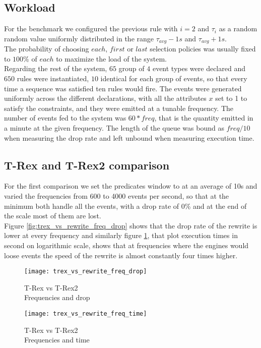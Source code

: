 \subsection{Workload}
\label{subsec:first-workload}
For the benchmark we configured the previous rule with $i=2$ and $\tau_i$ as a random random value uniformly distributed in the range $\tau_{avg} - 1s$ and $\tau_{avg} + 1s$.\\
The probability of choosing $each$, $first$ or $last$ selection policies was usually fixed to $100\%$ of $each$ to maximize the load of the system.\\
Regarding the rest of the system, $65$ group of $4$ event types were declared and $650$ rules were instantiated, $10$ identical for each group of events, so that every time a sequence was satisfied ten rules would fire. The events were generated uniformly across the different declarations, with all the attributes $x$ set to 1 to satisfy the constraints, and they were emitted at a tunable frequency. The number of events fed to the system was $60 * freq$, that is the quantity emitted in a minute at the given frequency. The length of the queue was bound as $freq / 10$ when measuring the drop rate and left unbound when measuring execution time.

\subsection{T-Rex and T-Rex2 comparison}
For the first comparison we set the predicates window to at an average of 10s and varied the frequencies from 600 to 4000 events per second, so that at the minimum both handle all the events, with a drop rate of 0\% and at the end of the scale most of them are lost.\\
Figure \ref{fig:trex_vs_rewrite_freq_drop} shows that the drop rate of the rewrite is lower at every frequency and similarly figure \ref{fig:trex_vs_rewrite_freq_time}, that plot execution times in second on logarithmic scale, shows that at frequencies where the engines would loose events the speed of the rewrite is almost constantly four times higher.
\begin{figure}[h]
\captionsetup{justification=centering}
\begin{minipage}{.5\textwidth}
  \centering
  \texttt{[image: trex\_vs\_rewrite\_freq\_drop]}
  \caption{T-Rex vs T-Rex2\\
  	Frequencies and drop}
  \label{fig:trex_vs_rewrite_freq_drop}
\end{minipage}%
\begin{minipage}{.5\textwidth}
  \centering
  \texttt{[image: trex\_vs\_rewrite\_freq\_time]}
  \caption{T-Rex vs T-Rex2\\
  	Frequencies and time}
  \label{fig:trex_vs_rewrite_freq_time}
\end{minipage}
\end{figure}

